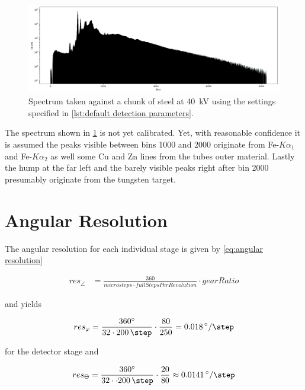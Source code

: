        \begin{figure}[h]
            \centering
            \includegraphics[width=\textwidth]{spectra/steel40kV.png}
            \caption[short]{Spectrum taken against a chunk of steel at \qty{40}{\kV} using the settings specified in \cref{lst:default detection parameters}.}%
            \label{fig:spectrum steel 40kV}
        \end{figure}

        The spectrum shown in \cref{fig:spectrum steel 40kV} is not yet calibrated.
        Yet, with reasonable confidence it is assumed the peaks visible between bins 1000 and 2000 originate from Fe-\(K\alpha_1\) and Fe-\(K\alpha_2\) as well some Cu and Zn lines from the tubes outer material.
        Lastly the hump at the far left and the barely visible peaks right after bin 2000 presumably originate from the tungsten target.

    \section{Angular Resolution}
        The angular resolution for each individual stage is given by \cref{eq:angular resolution}

        \begin{align}
            res_{\angle} &= \frac{360}{microsteps \cdot fullStepsPerRevolution} \cdot gearRatio
            \label{eq:angular resolution}
        \end{align}

        and yields

        \begin{align}
            res_{\varphi} = \frac{\qty{360}{\degree}}{32 \cdot \qty{200}{\step}} \cdot \frac{80}{250} = \qty{0.018}{\degree\per\step}
        \end{align}

        for the detector stage and

        \begin{align}
            res_{\Theta} = \frac{\qty{360}{\degree}}{32 \cdot \cdot \qty{200}{\step}} \cdot \frac{20}{80} \approx \qty{0.0141}{\degree\per\step}
        \end{align}